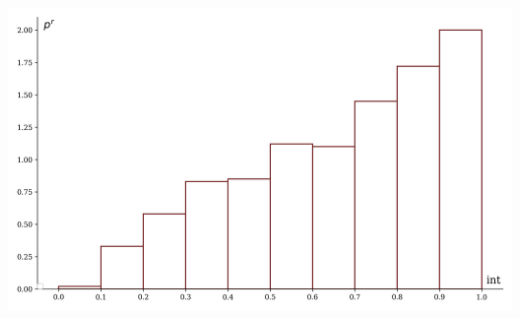 \documentclass[a4paper, 14pt]{extarticle}
\begin{document}
\begin{minipage}[t]{0.25\textwidth}
\includegraphics[width=\textwidth, height=\textheight, keepaspectratio]{sample24_hist}
\end{minipage}
\end{document}
